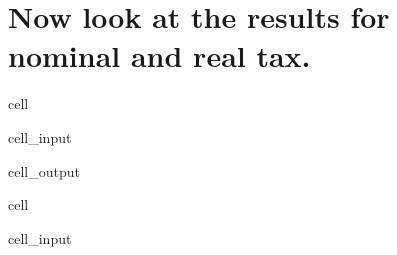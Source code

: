 \documentclass[letterpaper,10pt,english]{jupyterBook}
\begin{document}
\chapter{Now look at the results for nominal and real tax.}
\label{\detokenize{content/howto/modifymodel/create_real_model:now-look-at-the-results-for-nominal-and-real-tax}}
\begin{sphinxuseclass}{cell}\begin{sphinxVerbatimInput}

\begin{sphinxuseclass}{cell_input}
\begin{sphinxVerbatim}[commandchars=\\\{\}]
\end{sphinxVerbatim}

\end{sphinxuseclass}\end{sphinxVerbatimInput}
\begin{sphinxVerbatimOutput}

\begin{sphinxuseclass}{cell_output}
\noindent{}

\end{sphinxuseclass}\end{sphinxVerbatimOutput}

\end{sphinxuseclass}
\begin{sphinxuseclass}{cell}\begin{sphinxVerbatimInput}

\begin{sphinxuseclass}{cell_input}
\begin{sphinxVerbatim}[commandchars=\\\{\}]
  
\end{sphinxVerbatim}

\end{sphinxuseclass}\end{sphinxVerbatimInput}

\end{sphinxuseclass}
\end{document}
